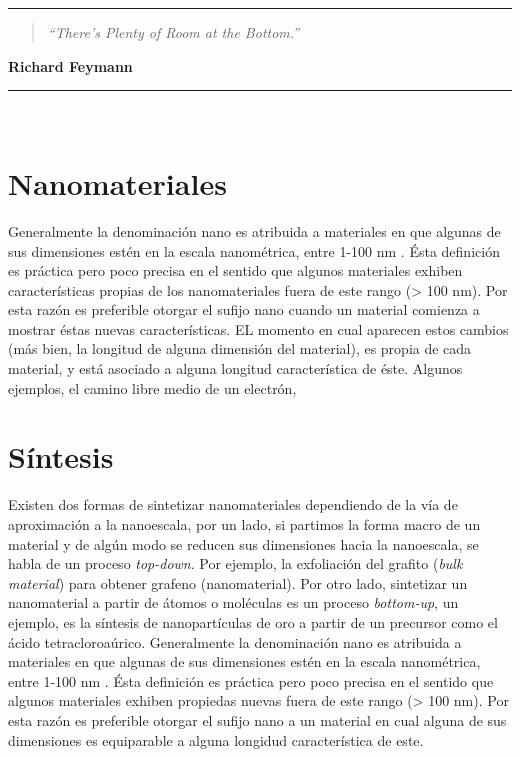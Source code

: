 \noindent
\rule{\linewidth}{1 pt}
\begin{flushright}
	\begin{quotation}
		\small{
			\textit{``There’s Plenty of Room at the Bottom.''}}
	\end{quotation}
	\bf{Richard Feymann}
\end{flushright}
\noindent
\rule{\linewidth}{1 pt}\\
\vfill
\section{Nanomateriales}
Generalmente la denominación nano es atribuida a materiales en que algunas de sus dimensiones estén en la escala nanométrica, entre 1-100 nm \cite{Gressler2013}. Ésta definición es práctica pero poco precisa en el sentido que algunos materiales exhiben características propias de los nanomateriales fuera de este rango (> 100 nm). Por esta razón es preferible otorgar el sufijo nano cuando un material comienza a mostrar éstas nuevas características. EL momento en cual aparecen estos cambios (más bien, la longitud de alguna dimensión del material), es propia de cada material, y está asociado a alguna longitud característica de éste. Algunos ejemplos, el camino libre medio de un electrón, 
\section{Síntesis}
Existen dos formas de sintetizar nanomateriales dependiendo de la vía de aproximación a la nanoescala, por un lado, si partimos la forma macro de un material y de algún modo se reducen sus dimensiones hacia la nanoescala, se habla de un proceso \textit{top-down}. Por ejemplo, la exfoliación del grafito (\textit{bulk material}) para obtener grafeno (nanomaterial).  Por otro lado, sintetizar un nanomaterial a partir de átomos o moléculas es un proceso \textit{bottom-up}, un ejemplo, es la síntesis de nanopartículas de oro a partir de un precursor como el ácido tetracloroaúrico.
Generalmente la denominación nano es atribuida a materiales en que algunas de sus dimensiones estén en la escala nanométrica, entre 1-100 nm \cite{Gressler2013}. Ésta definición es práctica pero poco precisa en el sentido que algunos materiales exhiben propiedas nuevas fuera de este rango (> 100 nm). Por esta razón es preferible otorgar el sufijo nano a un material en cual alguna de sus dimensiones es equiparable a alguna longidud característica de este.

